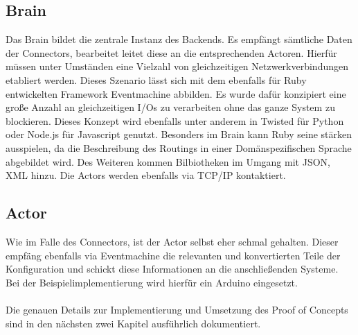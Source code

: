 \subsection{Brain}

Das Brain bildet die zentrale Instanz des Backends. Es empfängt sämtliche Daten der Connectors, bearbeitet leitet diese an die entsprechenden Actoren. Hierfür müssen unter Umständen eine Vielzahl von gleichzeitigen Netzwerkverbindungen etabliert werden. Dieses Szenario lässt sich mit dem ebenfalls für Ruby entwickelten Framework Eventmachine abbilden. Es wurde dafür konzipiert eine große Anzahl an gleichzeitigen I/Os zu verarbeiten ohne das ganze System zu blockieren. Dieses Konzept wird ebenfalls unter anderem in Twisted für Python oder Node.js für Javascript genutzt. Besonders im Brain kann Ruby seine stärken ausspielen, da die Beschreibung des Routings in einer Domänspezifischen Sprache abgebildet wird. Des Weiteren kommen Bilbiotheken im Umgang mit JSON, XML hinzu. Die Actors werden ebenfalls via TCP/IP kontaktiert. 

\subsection{Actor} 
Wie im Falle des Connectors, ist der Actor selbst eher schmal gehalten. Dieser empfäng ebenfalls via Eventmachine die relevanten und konvertierten Teile der Konfiguration und schickt diese Informationen an die anschließenden Systeme. Bei der Beispielimplementierung wird hierfür ein Arduino eingesetzt. 
\\\\
Die genauen Details zur Implementierung und Umsetzung des Proof of Concepts sind in den nächsten zwei Kapitel ausführlich dokumentiert. 






